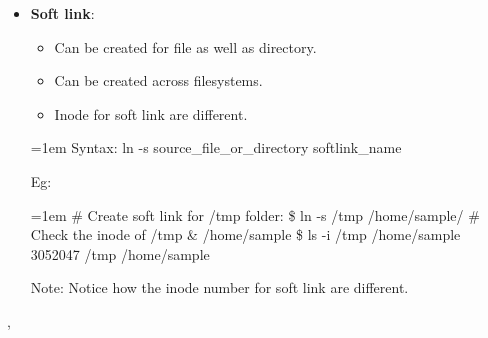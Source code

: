 \begin{flushleft}
\begin{itemize}
\begin{itemize}
			
			\newpage
			\item \textbf{Soft link}:
			\begin{itemize}
				\item Can be created for file as well as directory.
				\item Can be created across filesystems.
				\item Inode for soft link are different.
			\end{itemize}
			\bigskip
			\begin{tcolorbox}[breakable,notitle,boxrule=-0pt,colback=pink,colframe=pink]
				\color{black}
				\font=1em
				Syntax: ln -s source\_file\_or\_directory  softlink\_name
				\font=4pt
			\end{tcolorbox}
			Eg:
			\begin{tcolorbox}[breakable,notitle,boxrule=-0pt,colback=black,colframe=black]
				
				\font=1em
				\color{yellow}
				\# Create soft link for /tmp folder:
				\newline
				\color{green}
				\$ ln -s /tmp /home/sample/
				\newline
				\newline
				\color{yellow}
				\# Check the inode of /tmp \&  /home/sample
				\newline
				\color{green}
				\$ ls -i /tmp  /home/sample
				\newline
				\color{white}
				3052047 /tmp
				 /home/sample
				\font=4pt
			\end{tcolorbox}

			\bigskip
			\begin{tcolorbox}[breakable,notitle,boxrule=1pt,colback=yellow,colframe=yellow]
				\color{black}
				Note: Notice how the inode number for soft link are different.
			\end{tcolorbox}


		\end{itemize}
		
	\end{itemize}
	, 
	

	
\end{flushleft}

\newpage

